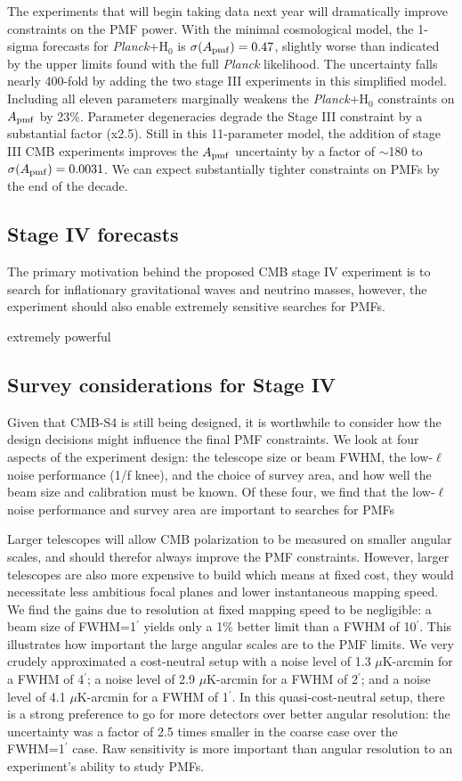 \documentclass[preprint]{emulateapj}
\newcommand{\apmf}{\ensuremath{A_{\rm pmf}}}
\newcommand{\ho}{H\ensuremath{_0}}
\newcommand{\ukarcmin}{\ensuremath{\mu}K-arcmin}
\newcommand{\planck}{{\sl Planck}}
\begin{document}
The experiments that will begin taking data next year will dramatically improve constraints on the PMF power. 
With the minimal cosmological model, the 1-sigma forecasts for \planck{}+\ho{} is $\sigma(\apmf)=0.47$, slightly worse than indicated by the upper limits found with the full \planck{} likelihood. 
The uncertainty falls nearly 400-fold by adding the two stage III experiments in this simplified model. 
Including all eleven parameters marginally weakens the \planck+\ho{} constraints on \apmf{} by 23\%. 
Parameter degeneracies degrade the Stage III constraint by a substantial factor (x2.5). 
Still in this 11-parameter model, the addition of stage III CMB experiments improves the \apmf{} uncertainty by a factor of $\sim$180 to  $\sigma(\apmf)=0.0031$. 
We can expect substantially tighter constraints on PMFs by the end of the decade. 

\subsection{Stage IV forecasts}

The primary motivation behind the proposed CMB stage IV experiment is to search for inflationary gravitational waves and neutrino masses, however, the experiment should also enable extremely sensitive searches for PMFs. 


 extremely powerful 


\subsection{Survey considerations for Stage IV}

Given that CMB-S4 is still being designed, it is worthwhile to consider how the design decisions might influence the final PMF constraints. 
We look at four aspects of the experiment design: the telescope size or beam FWHM, the low-$\ell$ noise performance (1/f knee), and the choice of survey area, and how well the beam size and calibration must be known. 
Of these four, we find that the low-$\ell$ noise performance and survey area are important to searches for PMFs 

Larger telescopes will allow CMB polarization to be measured on smaller angular scales, and should therefor always improve the PMF constraints. 
However, larger telescopes are also more expensive to build which means at fixed cost, they would necessitate less ambitious focal planes and lower instantaneous mapping speed. 
We find the gains due to resolution at fixed mapping speed to be negligible: a beam size of FWHM=1$^\prime$ yields only a 1\% better limit than a FWHM of 10$^\prime$. 
This illustrates how important the large angular scales are to the PMF limits. 
We very crudely approximated a cost-neutral setup with a noise level of 1.3 \ukarcmin{} for a FWHM of 4$^\prime$; a noise level of 2.9 \ukarcmin{} for a FWHM of 2$^\prime$; and a noise level of 4.1 \ukarcmin{} for a FWHM of 1$^\prime$. 
In this quasi-cost-neutral setup, there is a strong preference to go for more detectors over better angular resolution: the uncertainty was a factor of 2.5 times smaller in the coarse case over the FWHM=1$^\prime$ case. 
Raw sensitivity is more important than angular resolution to an experiment's ability to study PMFs.
\end{document}
